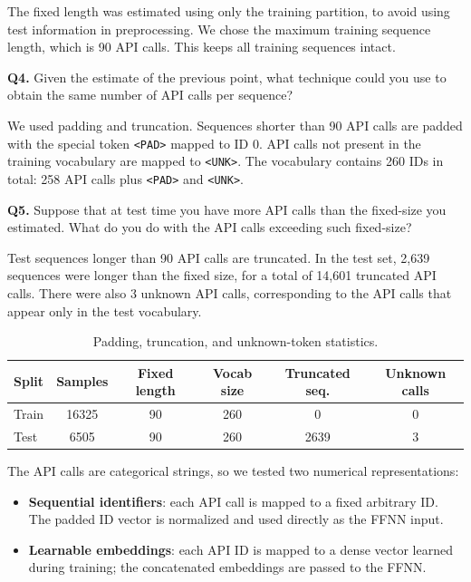The fixed length was estimated using only the training partition, to avoid using test information in
preprocessing. We chose the maximum training sequence length, which is 90 API calls. This keeps all
training sequences intact.

\begin{questionbox}
\textbf{Q4.} Given the estimate of the previous point, what technique could you use to obtain the
same number of API calls per sequence?
\end{questionbox}

We used padding and truncation. Sequences shorter than 90 API calls are padded with the special token
\texttt{<PAD>} mapped to ID 0. API calls not present in the training vocabulary are mapped to
\texttt{<UNK>}. The vocabulary contains 260 IDs in total: 258 API calls plus \texttt{<PAD>} and
\texttt{<UNK>}.

\begin{questionbox}
\textbf{Q5.} Suppose that at test time you have more API calls than the fixed-size you estimated.
What do you do with the API calls exceeding such fixed-size?
\end{questionbox}

Test sequences longer than 90 API calls are truncated. In the test set, 2,639 sequences were longer
than the fixed size, for a total of 14,601 truncated API calls. There were also 3 unknown API calls,
corresponding to the API calls that appear only in the test vocabulary.

\begin{table}[h!]
\centering
\begin{tabular}{lccccc}
\hline
\textbf{Split} & \textbf{Samples} & \textbf{Fixed length} & \textbf{Vocab size} &
\textbf{Truncated seq.} & \textbf{Unknown calls} \\
\hline
Train & 16325 & 90 & 260 & 0    & 0 \\
Test  & 6505  & 90 & 260 & 2639 & 3 \\
\hline
\end{tabular}
\caption{Padding, truncation, and unknown-token statistics.}
\label{tab:task2_preprocessing}
\end{table}

The API calls are categorical strings, so we tested two numerical representations:

\begin{itemize}
    \item \textbf{Sequential identifiers}: each API call is mapped to a fixed arbitrary ID. The padded
    ID vector is normalized and used directly as the FFNN input.
    \item \textbf{Learnable embeddings}: each API ID is mapped to a dense vector learned during
    training; the concatenated embeddings are passed to the FFNN.
\end{itemize}

